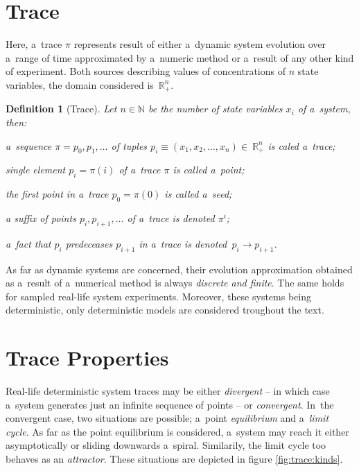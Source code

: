 \documentclass[12pt,oneside,draft]{fithesis}
\newcommand{\mReal}{\mathbb{R}}
\newcommand{\mNatural}{\mathbb{N}}
\newtheorem{mydef}{Definition}
\begin{document}
\section{Trace}
Here, a~trace $\pi$ represents result of either a~dynamic system
evolution over a~range of time\cite{sven}\cite{pospisil} approximated by
a~numeric method or a~result of any other kind of experiment.
Both sources describing values of concentrations of $n$ state variables,
the domain considered is~$\mReal_{+}^n$.

\begin{mydef}[Trace]
Let $n\in\mNatural$ be the number of state variables $x_i$ of a~system,
then:
\begin{inparaenum}
\item a~sequence $\pi=p_0,p_1,\dotsc$ of tuples
$p_i\equiv(x_1,x_2,\dotsc,x_n)\in~\mReal_{+}^n$ is caled a~trace;
\item single element $p_i=\pi(i)$ of a~trace $\pi$ is
called a~point;
\item the first point in a~trace $p_0=\pi(0)$ is called
a~seed;
\item a suffix of points $p_i,p_{i+1},\dotsc$ of a~trace is
denoted $\pi^i$;
\item a~fact that $p_i$ predeceases $p_{i+1}$ in a~trace is
denoted~$p_i\rightarrow p_{i+1}$.
\end{inparaenum}
\end{mydef}

As far as dynamic systems are concerned, their evolution approximation
obtained as a~result of a~numerical method is always \emph{discrete and
finite}. The same holds for sampled real-life system experiments.
Moreover, these systems being deterministic\cite{sven}, only
deterministic models are considered troughout the text.

\section{Trace Properties}
Real-life deterministic system traces may be either \emph{divergent} --
in which case a~system generates just an infinite sequence of points --
or \emph{convergent}. In~the convergent case, two situations are
possible; a~point \emph{equilibrium} and a~\emph{limit cycle}. As far as
the point equilibrium is considered, a~system may reach it either
asymptotically or sliding downwards a~spiral. Similarily, the limit
cycle too behaves as an \emph{attractor}. These situations are depicted
in figure \ref{fig:trace:kinds}.
\end{document}
